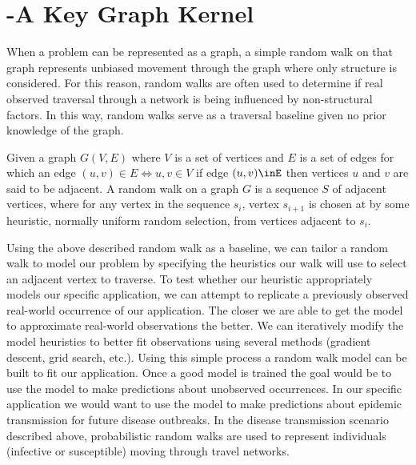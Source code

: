 \section{ -A Key Graph Kernel}\label{sec:problem-\myInitials}


When a problem can be represented as a graph, a simple random walk on that graph represents unbiased movement through the graph where only structure is considered. For this reason, random walks are often used to determine if real observed traversal through a network is being influenced by non-structural factors. In this way, random walks serve as a traversal baseline given no prior knowledge of the graph. 

Given a graph $G(V,E)$ where $V$ is a set of vertices and $E$ is a set of edges for which an edge $(u,v) \in E \iff u, v \in V$ if edge $(u,v)\inE$ then vertices $u$ and $v$ are said to be adjacent. A random walk on a graph $G$ is a sequence $S$ of adjacent vertices, where for any vertex in the sequence $s_i$, vertex $s_{i+1}$ is chosen at by some heuristic, normally uniform random selection, from vertices adjacent to $s_i$. 

Using the above described random walk as a baseline, we can tailor a random walk to model our problem by specifying the heuristics our walk will use to select an adjacent vertex to traverse. To test whether our heuristic appropriately models our specific application, we can attempt to replicate a previously observed real-world occurrence of our application. The closer we are able to get the model to approximate real-world observations the better. We can iteratively modify the model heuristics to better fit observations using several methods (gradient descent, grid search, etc.). Using this simple process a random walk model can be built to fit our application. Once a good model is trained the goal would be to use the model to make predictions about unobserved occurrences. In our specific application we would want to use the model to make predictions about epidemic transmission for future disease outbreaks. In the disease transmission scenario described above, probabilistic random walks are used to represent individuals (infective or susceptible) moving through travel networks.

